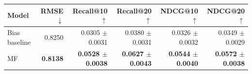 \begin{tabular}{lrrrrr}
\toprule
Model & RMSE $\downarrow$ & Recall@10 $\uparrow$ & Recall@20 $\uparrow$ & NDCG@10 $\uparrow$ & NDCG@20 $\uparrow$ \\
\midrule
Bias baseline & 0.8250 & 0.0305 $\pm$ 0.0031 & 0.0380 $\pm$ 0.0031 & 0.0326 $\pm$ 0.0032 & 0.0349 $\pm$ 0.0029 \\
MF & \textbf{0.8138} & \textbf{0.0528 $\pm$ 0.0038} & \textbf{0.0627 $\pm$ 0.0043} & \textbf{0.0544 $\pm$ 0.0040} & \textbf{0.0572 $\pm$ 0.0038} \\
\bottomrule
\end{tabular}

